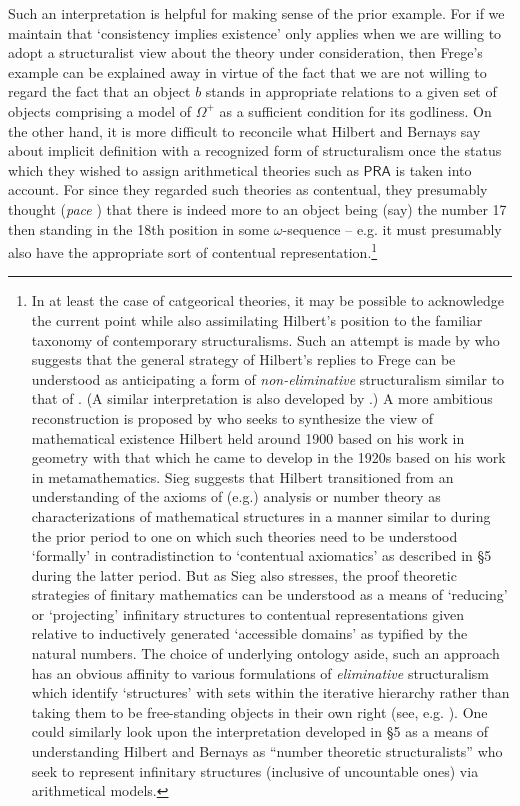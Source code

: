 \documentclass[11pt,fleqn,leqno]{article}
\begin{document}
Such an interpretation is helpful for making sense of the prior example.   For if we maintain that `consistency implies existence' only applies when we are willing to adopt a structuralist view about the theory under consideration, then Frege's example can be explained away in virtue of the fact that we are not willing to regard the fact that an object $b$ stands in appropriate relations to a given set of objects comprising a model of $\Omega^+$ as a sufficient condition for its godliness.   On the other hand, it is more difficult to reconcile what Hilbert and Bernays say about implicit definition with a recognized form of structuralism once the status which they wished to assign arithmetical theories such as $\mathsf{PRA}$ is taken into account.   For since they regarded such theories as contentual, they presumably thought (\textsl{pace} \citealp[p. 165]{Shapiro1997}) that there is indeed more to an object being (say) the number 17 then standing in the 18th position in some $\omega$-sequence --  e.g. it must presumably also have the appropriate sort of contentual representation.\footnote{In at least the case of catgeorical theories, it may be possible to acknowledge the current point while also assimilating Hilbert's position to the familiar taxonomy of contemporary structuralisms.   Such an attempt is made by \citet{Doherty2019} who suggests that the general strategy of Hilbert's replies to Frege can be understood as anticipating a form of \textsl{non-eliminative} structuralism similar to that of \citet{Shapiro1997}.  (A similar interpretation is also developed by \citealp{Isaacson2011a}.)  A more ambitious reconstruction is proposed by \citet{Sieg1990a,Sieg2014,Sieg2020} who seeks to synthesize the view of mathematical existence Hilbert held around 1900 based on his work in geometry with that which he came to develop in the 1920s based on his work in metamathematics.   Sieg suggests that Hilbert transitioned from an understanding of the axioms of (e.g.) analysis or number theory as characterizations of mathematical structures in a manner similar to \citet{Dedekind1888} during the prior period to one on which such theories need to be understood  `formally' in contradistinction to `contentual axiomatics' as described in \S 5 during the latter period.   But as Sieg also stresses, the proof theoretic strategies of finitary mathematics can be understood as a means of `reducing' or `projecting' infinitary structures to contentual representations given relative to inductively generated `accessible domains' as typified by the natural numbers.   The choice of underlying ontology aside, such an approach has an obvious affinity to various formulations of \textsl{eliminative} structuralism which identify `structures' with sets within the iterative hierarchy rather than taking them to be free-standing objects in their own right (see, e.g. \citealp{Reck2000}).  One could similarly look upon the interpretation developed in \S 5 as a means of understanding Hilbert and Bernays as ``number theoretic structuralists'' who seek to represent infinitary structures (inclusive of uncountable ones) via arithmetical models.}
\end{document}
